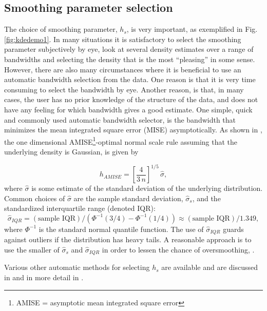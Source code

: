 \subsection{Smoothing parameter selection}
The choice of smoothing parameter,
$h_{s}$, is very important, as exemplified in Fig.\ref{fig:kdedemo1}.
In many situations it is satisfactory to select the smoothing
parameter subjectively by eye, \ie{} look at several density
estimates over a range of bandwidths and selecting the density that is
the most ``pleasing'' in some sense.
However, there are also many  circumstances where it is beneficial to
use an automatic bandwidth selection from the data. One reason is that
it is very time consuming to select the bandwidth by eye.
Another reason, is that,
in many cases, the user has no prior knowledge of the
structure of the data, and does not have any feeling for which
bandwidth gives a good estimate. One simple, quick and commonly used
automatic bandwidth selector, is the bandwidth that minimizes the mean
integrated square error (MISE) asymptotically. As shown in
\cite[Section 2.5 and 3.2.1]{WandAndJones1995Kernel}, the one dimensional
AMISE\footnote{AMISE = asymptotic mean integrated square error}-optimal normal
scale rule assuming that the underlying density is Gaussian, is given by

\begin{equation}
  \label{eq:Hamise}
  h_{AMISE} =
\left[\frac{4}{3\,n}\right]^{1/5}\,\widehat{\sigma} ,
\end{equation}
where $\widehat{\sigma}$ is some estimate of the standard deviation of the
underlying distribution. Common choices of $\widehat{\sigma}$ are the
sample standard deviation, $\widehat{\sigma}_{s}$, and the standardized
interquartile range (denoted IQR):
\begin{equation}
  \label{eq:Oiqr}
  \widehat{\sigma}_{IQR} = (\text{sample IQR})/
  (\Phi^{-1}(3/4)-\Phi^{-1}(1/4)) \approx  (\text{sample IQR})/1.349 ,
\end{equation}
where $\Phi^{-1}$ is the standard normal quantile function. The use of
$\widehat{\sigma}_{IQR}$ guards against outliers if the distribution has
heavy tails.
A reasonable approach is to use the smaller of $\widehat{\sigma}_{s}$ and
$\widehat{\sigma}_{IQR}$ in order to lessen the chance of oversmoothing,
\cite[see][pp.\ 47]{Silverman1986Density}.

Various other automatic methods for selecting $h_{s}$ are available and are
discussed in \cite{Silverman1986Density} and in more detail in
\cite{WandAndJones1995Kernel}.

